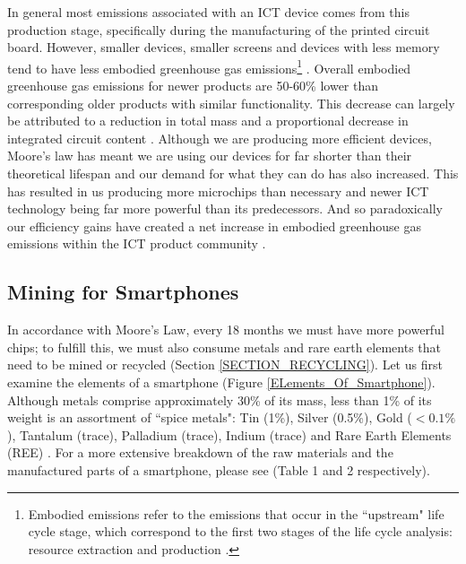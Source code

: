 \documentclass{article}
\begin{document}
In general most emissions associated with an ICT device comes from this production stage, specifically during the manufacturing of the printed circuit board. However, smaller devices, smaller screens and devices with less memory tend to have less embodied greenhouse gas emissions\footnote{Embodied emissions refer to the emissions that occur in the ``upstream" life cycle stage, which correspond to the first two stages of the life cycle analysis: resource extraction and production \cite{teehan2013comparing}.} \cite{louis2020sources, teehan2013comparing}. Overall embodied greenhouse gas emissions for newer products are 50-60\% lower than corresponding older products with similar functionality. This decrease can largely be attributed to a reduction in total mass and a proportional decrease in integrated circuit content \cite{teehan2013comparing}. Although we are producing more efficient devices, Moore's law has meant we are using our devices for far shorter than their theoretical lifespan and our demand for what they can do has also increased. This has resulted in us producing more microchips than necessary and newer ICT technology being far more powerful than its predecessors. And so paradoxically our efficiency gains have created a net increase in embodied greenhouse gas emissions within the ICT product community \cite{ryen2015consumption}.


 
\subsection{Mining for Smartphones} \label{SECTION_ACQUISITION_RAW_MATERIALS}
In accordance with Moore's Law, every 18 months we must have more powerful chips; to fulfill this, we must also consume metals and rare earth elements that need to be mined or recycled (Section \ref{SECTION_RECYCLING}). Let us first examine the elements of a smartphone (Figure \ref{ELements_Of_Smartphone}). Although metals comprise approximately 30\% of its mass, less than 1\% of its weight is an assortment of ``spice metals": Tin (1\%), Silver (0.5\%), Gold ($<0.1\%$), Tantalum (trace), Palladium (trace), Indium (trace) and Rare Earth Elements (REE) \cite{bournay2006vital, compoundinterest2014, reller2009mobile}. For a more extensive breakdown of the raw materials and the manufactured parts of a smartphone, please see \cite{andrae2015life} (Table 1 and 2 respectively). 
\end{document}

